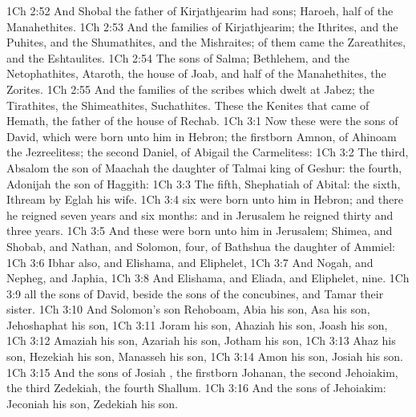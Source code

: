 \vs 1Ch 2:52 And Shobal the father of Kirjathjearim had sons; Haroeh,  half of the Manahethites.
\vs 1Ch 2:53 And the families of Kirjathjearim; the Ithrites, and the Puhites, and the Shumathites, and the Mishraites; of them came the Zareathites, and the Eshtaulites.
\vs 1Ch 2:54 The sons of Salma; Bethlehem, and the Netophathites, Ataroth, the house of Joab, and half of the Manahethites, the Zorites.
\vs 1Ch 2:55 And the families of the scribes which dwelt at Jabez; the Tirathites, the Shimeathites,  Suchathites. These  the Kenites that came of Hemath, the father of the house of Rechab.
\vs 1Ch 3:1 Now these were the sons of David, which were born unto him in Hebron; the firstborn Amnon, of Ahinoam the Jezreelitess; the second Daniel, of Abigail the Carmelitess:
\vs 1Ch 3:2 The third, Absalom the son of Maachah the daughter of Talmai king of Geshur: the fourth, Adonijah the son of Haggith:
\vs 1Ch 3:3 The fifth, Shephatiah of Abital: the sixth, Ithream by Eglah his wife.
\vs 1Ch 3:4  six were born unto him in Hebron; and there he reigned seven years and six months: and in Jerusalem he reigned thirty and three years.
\vs 1Ch 3:5 And these were born unto him in Jerusalem; Shimea, and Shobab, and Nathan, and Solomon, four, of Bathshua the daughter of Ammiel:
\vs 1Ch 3:6 Ibhar also, and Elishama, and Eliphelet,
\vs 1Ch 3:7 And Nogah, and Nepheg, and Japhia,
\vs 1Ch 3:8 And Elishama, and Eliada, and Eliphelet, nine.
\vs 1Ch 3:9  all the sons of David, beside the sons of the concubines, and Tamar their sister.
\vs 1Ch 3:10 And Solomon's son  Rehoboam, Abia his son, Asa his son, Jehoshaphat his son,
\vs 1Ch 3:11 Joram his son, Ahaziah his son, Joash his son,
\vs 1Ch 3:12 Amaziah his son, Azariah his son, Jotham his son,
\vs 1Ch 3:13 Ahaz his son, Hezekiah his son, Manasseh his son,
\vs 1Ch 3:14 Amon his son, Josiah his son.
\vs 1Ch 3:15 And the sons of Josiah , the firstborn Johanan, the second Jehoiakim, the third Zedekiah, the fourth Shallum.
\vs 1Ch 3:16 And the sons of Jehoiakim: Jeconiah his son, Zedekiah his son.
